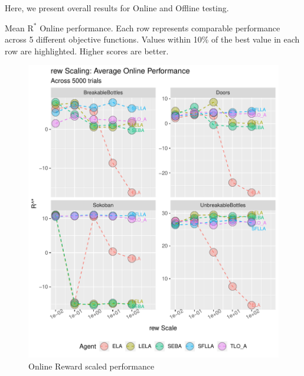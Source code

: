 Here, we present overall results for Online and Offline testing. 


\begin{table}[t]
\tiny
  \caption{Mean $\text{R}^*$ Online performance. Each row represents comparable performance across 5 different objective functions. Values within 10\% of the best value in each row are highlighted. Higher scores are better.}
  \label{tab:mean_r_star_performance}

\end{table}
\begin{figure}[h]
 
  \includegraphics[width=\columnwidth]{output/onlinerew.pdf}
  \caption{Online Reward scaled performance}
  \label{fig:offline_pen_performance}
\end{figure}

